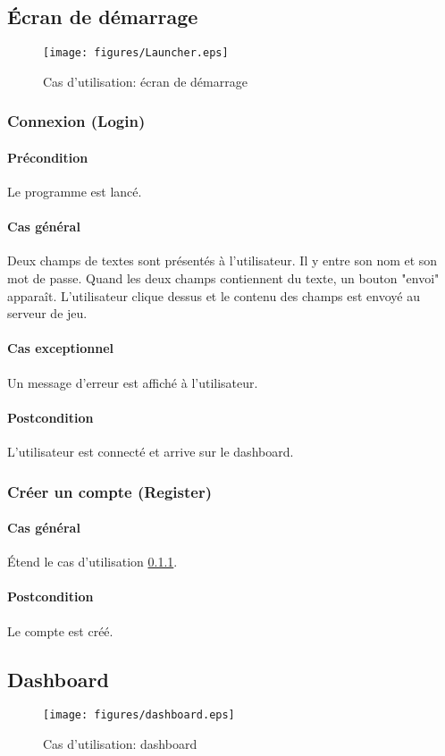 \subsection{\'Ecran de démarrage}
\begin{figure}[h!]
    \centering
    \texttt{[image: figures/Launcher.eps]}
    \caption{\label{fig:UC:launcher} Cas d'utilisation: écran de démarrage}
\end{figure}

\subsubsection{Connexion (Login)}
    \label{UC:login}
    \paragraph{Précondition} Le programme est lancé.
    \paragraph{Cas général} Deux champs de textes sont présentés à l'\gls{utilisateur}. Il y entre son nom et son mot de passe. Quand les deux champs contiennent du texte, un bouton "envoi" apparaît. L'utilisateur clique dessus et le contenu des champs est envoyé au serveur de jeu.
    \paragraph{Cas exceptionnel} Un message d'erreur est affiché à l'utilisateur.
    \paragraph{Postcondition} L'utilisateur est connecté et arrive sur le dashboard.

\subsubsection{Créer un compte (Register)}
    \paragraph{Cas général} \'Etend le cas d'utilisation \ref{UC:login}.
    \paragraph{Postcondition} Le compte est créé.

\subsection{Dashboard}
\begin{figure}[h!]
    \centering
    \texttt{[image: figures/dashboard.eps]}
    \caption{\label{fig:UC:dashboard} Cas d'utilisation: dashboard}
\end{figure}

